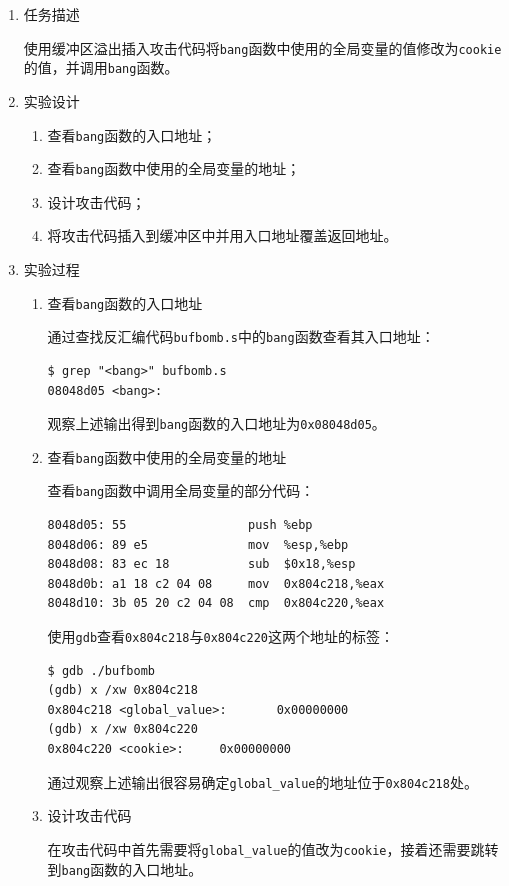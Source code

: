 \documentclass{paper}
\begin{document}
\begin{enumerate}
\item 任务描述

使用缓冲区溢出插入攻击代码将\verb|bang|函数中使用的全局变量的值修改为\verb|cookie|的值，并调用\verb|bang|函数。

\item 实验设计

\begin{enumerate}
\item 查看\verb|bang|函数的入口地址；
\item 查看\verb|bang|函数中使用的全局变量的地址；
\item 设计攻击代码；
\item 将攻击代码插入到缓冲区中并用入口地址覆盖返回地址。
\end{enumerate}

\item 实验过程

\begin{enumerate}
\item 查看\verb|bang|函数的入口地址

通过查找反汇编代码\verb|bufbomb.s|中的\verb|bang|函数查看其入口地址：
\begin{lstlisting}
$ grep "<bang>" bufbomb.s
08048d05 <bang>:
\end{lstlisting}
观察上述输出得到\verb|bang|函数的入口地址为\verb|0x08048d05|。

\item 查看\verb|bang|函数中使用的全局变量的地址

查看\verb|bang|函数中调用全局变量的部分代码：
\begin{lstlisting}
8048d05: 55                 push %ebp
8048d06: 89 e5              mov  %esp,%ebp
8048d08: 83 ec 18           sub  $0x18,%esp
8048d0b: a1 18 c2 04 08     mov  0x804c218,%eax
8048d10: 3b 05 20 c2 04 08  cmp  0x804c220,%eax
\end{lstlisting}
使用\verb|gdb|查看\verb|0x804c218|与\verb|0x804c220|这两个地址的标签：
\begin{lstlisting}
$ gdb ./bufbomb
(gdb) x /xw 0x804c218
0x804c218 <global_value>:       0x00000000
(gdb) x /xw 0x804c220
0x804c220 <cookie>:     0x00000000
\end{lstlisting}
通过观察上述输出很容易确定\verb|global_value|的地址位于\verb|0x804c218|处。

\item 设计攻击代码

在攻击代码中首先需要将\verb|global_value|的值改为\verb|cookie|，接着还需要跳转到\verb|bang|函数的入口地址。


\end{enumerate}
\end{enumerate}
\end{document}
